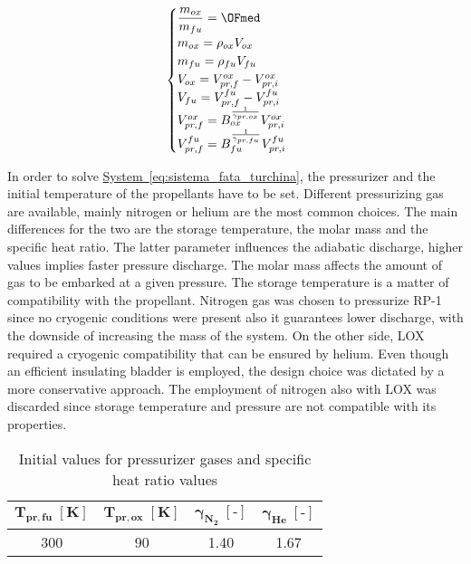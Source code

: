 \begin{equation}
    \begin{cases}
    \dfrac{m_{ox}}{m_{fu}} = \OFmed\\
     m_{ox} = \rho_{ox}V_{ox}\\
     m_{fu} = \rho_{fu}V_{fu}\\
     V_{ox} = V_{pr, f}^{ox} - V_{pr, i}^{ox}\\
     V_{fu} = V_{pr, f}^{fu} - V_{pr, i}^{fu}\\
     V_{pr,f}^{ox} = B_{ox}^{\frac{1}{\gamma_{pr,ox}}}V_{pr, i}^{ox}\\
     V_{pr,f}^{fu} = B_{fu}^{\frac{1}{\gamma_{pr,fu}}}V_{pr, i}^{fu}\\
     \end{cases}\
     \label{eq:sistema_fata_turchina}
\end{equation}

\vspace{0.15cm}

In order to solve \hyperref[eq:sistema_fata_turchina]{System~\ref*{eq:sistema_fata_turchina}}, the pressurizer and the initial temperature of the propellants have to be set. Different pressurizing gas are available, mainly nitrogen or helium are the most common choices.
The main differences for the two are the storage temperature, the molar mass and the specific heat ratio. The latter parameter influences the adiabatic discharge, higher values implies faster pressure discharge.
The molar mass affects the amount of gas to be embarked at a given pressure. The storage temperature is a matter of compatibility with the propellant.
Nitrogen gas was chosen to pressurize RP-1 since no cryogenic conditions were present also it guarantees lower discharge, with the downside of increasing the mass of the system.
On the other side, LOX required a cryogenic compatibility that can be ensured by helium. Even though an efficient insulating bladder is employed, the design choice was dictated by a more conservative approach.
The employment of nitrogen also with LOX was discarded since storage temperature and pressure are not compatible with its properties\cite{nist}.
\begin{table}[H]
    \renewcommand{\arraystretch}{1.2}
    \centering
    \begin{tabular}{|c|c|c|c|}
        \hline
        $\boldsymbol{T_{pr,fu} \; [\textbf{K}]}$ & $\boldsymbol{T_{pr,ox} \; [\textbf{K}]}$ & $\boldsymbol{\gamma_{N_2} \; [\textbf{-}]}$  & $\boldsymbol{\gamma_{He} \; [\textbf{-}]}$ \\
        \hline
        \hline
        300 & 90 & 1.40 & 1.67 \\
        \hline
    \end{tabular}
    \caption{Initial values for pressurizer gases and specific heat ratio values}
    \label{table:press_value}
\end{table}


